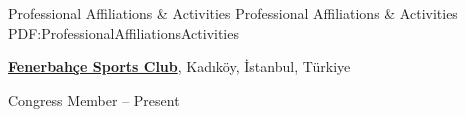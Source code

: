 \documentclass[letterpaper,MMMyyyy,nonstopmode]{simpleresumecv}
\begin{document}
\begin{Body}
\Section
{Professional Affiliations\newline
\& Activities}
{Professional Affiliations \& Activities}
{PDF:ProfessionalAffiliationsActivities}

\Entry
\href{http://www.example.com/my-society}
{\textbf{Fenerbahçe Sports Club}},
Kadıköy, İstanbul, Türkiye

\Gap
\BulletItem
Congress Member
\hfill
{} --
Present











\end{Body}
\end{document}

